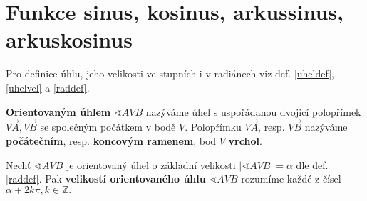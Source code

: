 \section{Funkce sinus, kosinus, arkussinus, arkuskosinus}

\begin{pozn}
  Pro definice úhlu, jeho velikosti ve stupních i v radiánech viz def. \ref{uheldef}, \ref{uhelvel} a \ref{raddef}.
\end{pozn}

\begin{comment}
\begin{definition}
    Nechť $\sphericalangle AVB$ je úhel. Pak mu přiřazujeme číslo $a\in \mathbb R$,
    které nazýváme \textbf{velikostí úhlu} $\sphericalangle AVB$ takto:\\
    Nechť $k(V,r), X\in k\cap \overrightarrow{VA}, Y\in k\cap \overrightarrow{VB}.$
    Označme $s$ velikost oblouku $XY.$ Velikost úhlu pak definujeme jako
    $$\alpha = \frac{s}{r}.$$
\end{definition}

\begin{pozn}
    Je-li $s=r,$ má úhel $\alpha$ velikost 1 \textbf{radián}. Velikost úhlu lze vyjadřovat
    též ve stupních, přičemž platí $2\pi=360^\circ$.
\end{pozn}

\begin{veta}
    Nechť $\sphericalangle AVB$ je úhel, $\alpha$ jeho velikost v radiánech a $\beta$
    jeho velikost ve stupních. Pak platí:
    \begin{align*}
        \alpha = \beta\cdot \frac{\pi}{180^\circ}, & & \beta = \alpha\cdot \frac{180^\circ}{\pi}.
    \end{align*}
\end{veta}

PRESUNUTO DO PLANIMETRIE
\end{comment}

\begin{definition}
    \textbf{Orientovaným úhlem} $\sphericalangle AVB$ nazýváme úhel s uspořádanou dvojicí
    polopřímek $\overrightarrow{VA}, \overrightarrow{VB}$ se společným počátkem v bodě $V.$
    Polopřímku $\overrightarrow{VA}$, resp. $\overrightarrow{VB}$ nazýváme \textbf{počátečním},
    resp. \textbf{koncovým ramenem}, bod $V$ \textbf{vrchol}.
\end{definition}

\begin{definition}
    Nechť $\sphericalangle AVB$ je orientovaný úhel o základní velikosti $|\sphericalangle AVB| = \alpha$ dle def. \ref{raddef}. Pak
    \textbf{velikostí orientovaného úhlu} $\sphericalangle AVB$ rozumíme každé z
    čísel $\alpha +2k\pi, k \in \mathbb Z.$
\end{definition}

